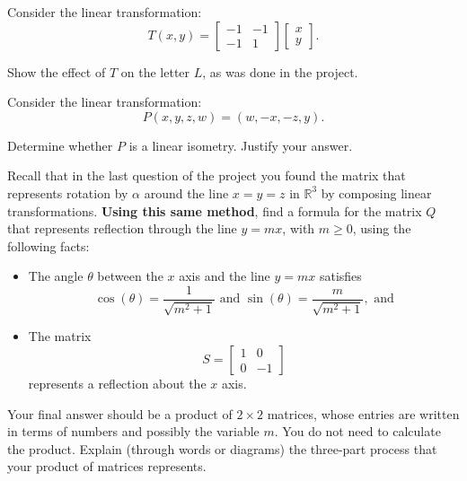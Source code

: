 \documentclass[addpoints]{exam}
\newcommand{\R}{\mathbb{R}}
\begin{document}
\begin{questions}

\question[30] Consider the linear transformation:
\[T(x,y)=\begin{bmatrix}
-1 & -1 \\
-1 & 1
\end{bmatrix}
\begin{bmatrix} x \\ y \end{bmatrix}.\]

Show the effect of $T$ on the letter $L$, as was done in the project.
 
\question[40] Consider the linear transformation:
\[P(x,y,z,w) = (w,-x,-z,y).\]

Determine whether $P$ is a linear isometry. Justify your answer.

\question[30] Recall that in the last question of the project you found the matrix that represents rotation by $\alpha$ around the line $x=y=z$ in $\R^3$ by composing linear transformations. \textbf{Using this same method}, find a formula for the matrix $Q$ that represents reflection through the line $y = mx$, with $m\geq 0$, using the following facts:
\begin{itemize}
\item The angle $\theta$ between the $x$ axis and the line $y = mx$ satisfies
\[\cos(\theta) = \frac1{\sqrt{m^2 + 1}} \text{ and } \sin(\theta) = \frac m{\sqrt{m^2 + 1}},\text{ and} \]
\item The matrix
\[S = \begin{bmatrix}
1 & 0 \\
0 & -1
\end{bmatrix}\]
represents a reflection about the $x$ axis.
\end{itemize}

Your final answer should be a product of $2\times 2$ matrices, whose entries are written in terms of numbers and possibly the variable $m$. You do not need to calculate the product. Explain (through words or diagrams) the three-part process that your product of matrices represents.
\end{questions}
\end{document}
